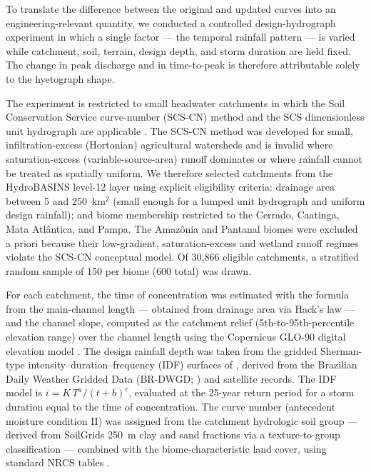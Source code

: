 \documentclass[a4paper,fleqn]{cas-sc}
\begin{document}
To translate the difference between the original and updated curves into
an engineering-relevant quantity, we conducted a controlled
design-hydrograph experiment in which a single factor — the temporal
rainfall pattern — is varied while catchment, soil, terrain, design
depth, and storm duration are held fixed. The change in peak discharge
and in time-to-peak is therefore attributable solely to the hyetograph
shape.

The experiment is restricted to small headwater catchments in which the
Soil Conservation Service curve-number (SCS-CN) method and the SCS
dimensionless unit hydrograph are applicable
\citep{NRCS2004, TR55_1986}. The SCS-CN method was developed for small,
infiltration-excess (Hortonian) agricultural watersheds and is invalid
where saturation-excess (variable-source-area) runoff dominates or where
rainfall cannot be treated as spatially uniform. We therefore selected
catchments from the HydroBASINS level-12 layer \citep{Lehner2013} using
explicit eligibility criteria: drainage area between 5 and 250~km$^2$
(small enough for a lumped unit hydrograph and uniform design rainfall);
and biome membership restricted to the Cerrado, Caatinga, Mata
Atlântica, and Pampa. The Amazônia and Pantanal biomes were excluded a
priori because their low-gradient, saturation-excess and wetland runoff
regimes violate the SCS-CN conceptual model. Of 30{,}866 eligible
catchments, a stratified random sample of 150 per biome (600 total) was
drawn.

For each catchment, the time of concentration was estimated with the
\citet{Kirpich1940} formula from the main-channel length — obtained from
drainage area via Hack's law — and the channel slope, computed as the
catchment relief (5th-to-95th-percentile elevation range) over the
channel length using the Copernicus GLO-90 digital elevation model
\citep{CopernicusDEM}. The design rainfall depth was taken from the gridded
Sherman-type intensity–duration–frequency (IDF) surfaces of
\citet{GomesJuniorIDF}, derived from the Brazilian Daily Weather
Gridded Data (BR-DWGD; \citealt{Xavier2022}) and satellite records.
The IDF model is $i = K\,T^{a}/(t+b)^{c}$, evaluated at the
25-year return period for a storm duration equal to the time of
concentration. The curve number (antecedent moisture condition II) was
assigned from the catchment hydrologic soil group — derived from
SoilGrids 250~m clay and sand fractions \citep{Poggio2021} via a
texture-to-group classification — combined with the biome-characteristic
land cover, using standard NRCS tables \citep{NRCS2004}.
\end{document}
